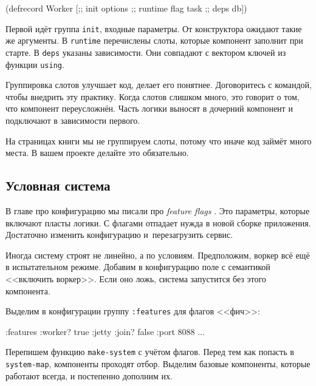 \begin{english}
  \begin{clojure}
(defrecord Worker
    [;; init
     options
     ;; runtime
     flag
     task
     ;; deps
     db])
  \end{clojure}
\end{english}

Первой идёт группа \verb|init|, входные параметры. От конструктора ожидают
такие же аргументы. В \verb|runtime| перечислены слоты, которые компонент
заполнит при старте. В \verb|deps| указаны зависимости. Они совпадают с
вектором ключей из функции \verb|using|.

Группировка слотов улучшает код, делает его понятнее. Договоритесь с командой,
чтобы внедрить эту практику. Когда слотов слишком много, это говорит о том, что
компонент переусложнён. Часть логики выносят в дочерний компонент и подключают в
зависимости первого.

На страницах книги мы не группируем слоты, потому что иначе код займёт много
места. В вашем проекте делайте это обязательно.

\subsection{Условная система}


В главе про конфигурацию мы писали про \emph{feature flags} .
Это параметры, которые включают пласты логики. С флагами отпадает нужда в новой сборке
приложения. Достаточно изменить конфигурацию и~перезагрузить сервис.

Иногда систему строят не линейно, а по условиям. Предположим, воркер
всё ещё в испытательном режиме. Добавим в конфигурацию поле с семантикой
<<включить воркер>>. Если оно ложь, система запустится без этого компонента.


Выделим в конфигурации группу \verb|:features| для флагов <<фич>>:

\begin{english}
  \begin{clojure}
{:features {:worker? true}
 :jetty {:join? false :port 8088}
 ...}
  \end{clojure}
\end{english}

Перепишем функцию \verb|make-system| с учётом флагов. Перед тем как попасть в
\verb|system-map|, компоненты проходят отбор. Выделим базовые компоненты,
которые работают всегда, и постепенно дополним их.

